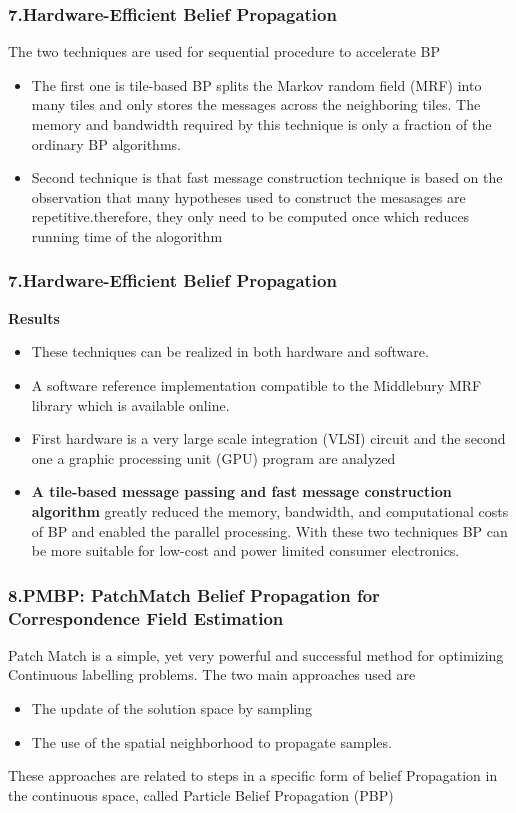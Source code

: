 \documentclass{beamer}
\begin{document}
\begin{frame}
\frametitle{\textbf{7.Hardware-Efficient Belief Propagation}}
The two techniques are used for sequential procedure to accelerate BP
\begin{itemize}
\item The first one is tile-based BP  splits the Markov random field (MRF) into many tiles and only stores the messages across the neighboring tiles. The memory and bandwidth required by this technique is only a fraction of the ordinary BP algorithms.

\item Second technique is that  fast message construction technique is based on the observation that many hypotheses used to construct the mesasages are repetitive.therefore, they only need to be computed once which reduces running time of the  alogorithm

\end{itemize}
\end{frame}

\begin{frame}
\frametitle{\textbf{7.Hardware-Efficient Belief Propagation}}
\textbf{Results}
\begin{itemize}
\item These techniques can be realized in both hardware and software.
\item A software reference implementation compatible to  the  Middlebury  MRF  library which  is  available  online.
\item  First  hardware  is a very large scale integration (VLSI) circuit and the second one a graphic processing unit (GPU) program are analyzed
\item \textbf{ A tile-based message passing and fast message construction  algorithm }greatly reduced the memory, bandwidth, and computational costs of BP and enabled the parallel processing. With these two techniques  BP  can be  more suitable for low-cost and power limited consumer electronics.
\end{itemize}
\end{frame}

\begin{frame}
\frametitle{\textbf{8.PMBP: PatchMatch Belief Propagation for Correspondence Field Estimation}}
Patch Match is a simple, yet very powerful and successful method for optimizing Continuous labelling problems.
The two main approaches  used are
\begin{itemize}
\item The update of the solution space by sampling
\item The use of the spatial neighborhood to propagate samples.
\end{itemize}
These approaches are related to steps in a specific form of belief Propagation in the continuous space, called Particle Belief Propagation (PBP)
\end{frame}
\end{document}
